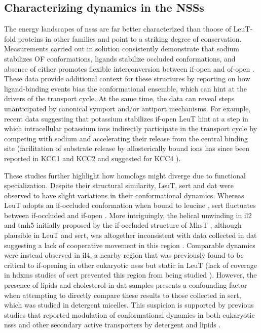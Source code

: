 \subsection{Characterizing dynamics in the NSSs}\label{sec:leutintro_nss_dynamics}

The energy landscapes of \gls{nss}s are far better characterized than thoose of LeuT-fold proteins in other families and point to a striking degree of conservation. Measurements carried out in solution consistently demonstrate that sodium stabilizes OF conformations, ligands stabilize occluded conformations, and absence of either promotes flexible interconversion between \gls{if}-open and \gls{of}-open \citep*{Kazmier2014, Merkle2018, Terry2018, Zhang2018, Zhang2021}. These data provide additional context for these structures by reporting on how ligand-binding events bias the conformational ensemble, which can hint at the drivers of the transport cycle. At the same time, the data can reveal steps unanticipated by canonical symport and/or antiport mechanisms. For example, recent data suggesting that potassium stabilizes \gls{if}-open LeuT hint at a step in which intracellular potassium ions indirectly participate in the transport cycle by competing with sodium and accelerating their release from the central binding site \citep*{Billesbølle2016, Merkle2018} (facilitation of substrate release by allosterically bound ions has since been reported in KCC1 \citep*{Liu2019} and KCC2 \citep*{Zhang2021a} and suggested for KCC4 \citep*{Reid2020}).

These studies further highlight how homologs might diverge due to functional specialization. Despite their structural similarity, LeuT, \gls{sert} and \gls{dat} were observed to have slight variations in their conformational dynamics. Whereas LeuT adopts an \gls{if}-occluded conformation when bound to leucine \citep*{Kazmier2014a, Merkle2018}, \gls{sert} fluctuates between \gls{if}-occluded and \gls{if}-open \citep*{Moeller2019}. More intriguingly, the helical unwinding in \gls{il}2 and \gls{tmh}5 initially proposed by the \gls{if}-occluded structure of MhsT \citep*{Malinauskaite2014}, although plausible in LeuT and \gls{sert}, was altogether inconsistent with data collected in \gls{dat} suggesting a lack of cooperative movement in this region \citep*{Nielsen2019}. Comparable dynamics were instead observed in \gls{il}4, a nearby region that was previously found to be critical to \gls{if}-opening in other eukaryotic \gls{nss}s but static in LeuT \citep*{Hansra2004, Kazmier2014a} (lack of coverage in \gls{hdxms} studies of \gls{sert} prevented this region from being studied \citep*{Moeller2019}). However, the presence of lipids and cholesterol in \gls{dat} samples presents a confounding factor when attempting to directly compare these results to those collected in \gls{sert}, which was studied in detergent micelles. This suspicion is supported by previous studies that reported modulation of conformational dynamics in both eukaryotic \gls{nss}s and other secondary active transporters by detergent and lipids \citep*{Coleman2019, Damian2021, Jagessar2020, Martens2016, Moeller2019, Penmatsa2013, Zakrzewska2019}.

